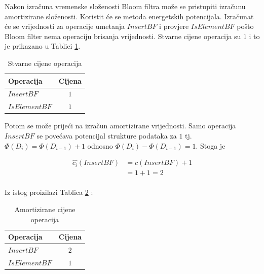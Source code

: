 \documentclass{foi}
\begin{document}
Nakon izračuna vremenske složenosti Bloom filtra može se pristupiti izračunu amortizirane složenosti. Koristit će se metoda energetskih potencijala. Izračunat će se vrijednosti za operacije umetanja $InsertBF$ i provjere $IsElementBF$ pošto Bloom filter nema operaciju brisanja vrijednosti. Stvarne cijene operacija su $1$ i to je prikazano u Tablici \ref{table:tablica2}.

\begin{table}[H]
    \centering
    \def\arraystretch{1.4}
    \caption{Stvarne cijene operacija}
    \begin{tabular}{l|c}
    \hline
    \rowcolor[HTML]{416A85}
    \color{white} Operacija & \color{white} Cijena \\ 
    \hline 
    $InsertBF$ & $1$ \\
    \hline 
    $IsElementBF$ & $1$ \\
    \hline
    \end{tabular}
    \label{table:tablica2}
    \end{table}

Potom se može prijeći na izračun amortizirane vrijednosti. Samo operacija $InsertBF$ se povećava potencijal strukture podataka za $1$ tj. $ \Phi \left(D_i\right) = \Phi \left(D_{i-1}\right) + 1$ odnosno $ \Phi \left(D_i\right) - \Phi \left(D_{i-1}\right) = 1 $. Stoga je

\begin{equation*}
    \begin{aligned}
    \hat{c_i} \left(InsertBF\right) & = c \left(InsertBF\right) + 1\\
    & =  1 + 1 = 2 \\
    \end{aligned}
\end{equation*}

Iz istog proizilazi Tablica \ref{table:tablica3} :

\begin{table}[H]
    \centering
    \def\arraystretch{1.4}
    \caption{Amortizirane cijene operacija}
    \begin{tabular}{l|c}
    \hline
    \rowcolor[HTML]{416A85}
    \color{white} Operacija & \color{white} Cijena \\ 
    \hline 
    $InsertBF$ & $2$ \\
    \hline 
    $IsElementBF$ & $1$ \\
    \hline
    \end{tabular}
    \label{table:tablica3}
    \end{table}
\end{document}
